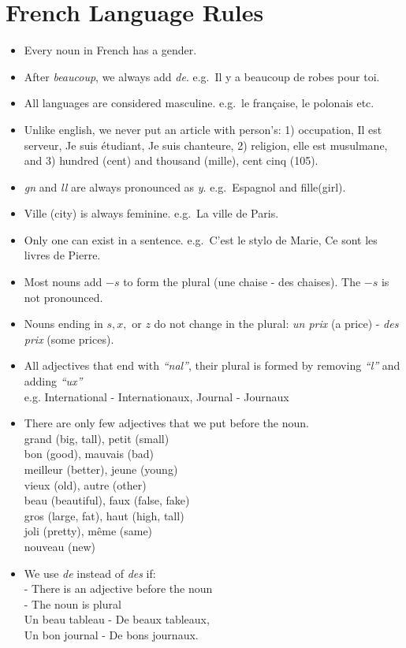 \section{French Language Rules}

\begin{itemize}

\item{Every noun in French has a gender.}

\item{After \emph{beaucoup}, we always add \emph{de}. e.g.\ Il y a beaucoup de
robes pour toi.}

\item{All languages are considered masculine. e.g.\ le fran\c{c}aise, le polonais
etc.}

\item{Unlike english, we never put an article with person's:
1) occupation, Il est serveur, Je suis \'etudiant, Je suis chanteure,
2) religion, elle est musulmane, and
3) hundred (cent) and thousand (mille), cent cinq (105).}

\item{\emph{gn} and \emph{ll} are always pronounced as \emph{y}. e.g.\ Espagnol and fille(girl).}

\item{Ville (city) is always feminine. e.g.\ La ville de Paris.}

\item{Only one can exist in a sentence. e.g.\ C'est le stylo de Marie, Ce sont les livres de Pierre.}

\item{Most nouns add $-s$ to form the plural (une chaise - des chaises).
The $-s$ is not pronounced.}

\item{Nouns ending in $s, x,$ or $z$ do not change in the plural:
\emph{un prix} (a price) - \emph{des prix} (some prices).}

\item{All adjectives that end with \emph{``nal''}, their plural is formed by removing
\emph{``l''} and adding \emph{``ux''}\\
e.g. International - Internationaux, Journal - Journaux}

\item{There are only few adjectives that we put before the noun.\\
grand (big, tall), petit (small)	 \\
bon (good), mauvais (bad) \\
meilleur (better), jeune (young)\\
vieux (old), autre (other) \\
beau (beautiful), faux (false, fake) \\
gros (large, fat), haut (high, tall) \\
joli (pretty), même (same) \\
nouveau (new)}

\item{We use \emph{de} instead of \emph{des} if:\\
- There is an adjective before the noun\\
- The noun is plural\\
Un beau tableau - De beaux tableaux,\\
Un bon journal - De bons journaux.}


\end{itemize}
